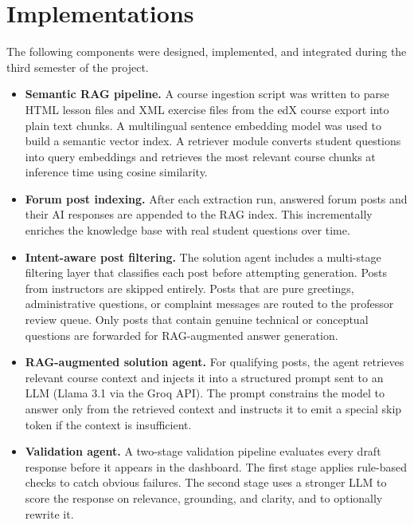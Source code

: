 \documentclass[12pt, a4paper]{article}
\begin{document}
\section{Implementations}

The following components were designed, implemented, and integrated during the third semester of the project.

\begin{itemize}[leftmargin=1.5em, itemsep=4pt]

  \item \textbf{Semantic RAG pipeline.} A course ingestion script was written to parse HTML lesson files and XML exercise files from the edX course export into plain text chunks. A multilingual sentence embedding model \cite{reimers2020multilingual} was used to build a semantic vector index. A retriever module converts student questions into query embeddings and retrieves the most relevant course chunks at inference time using cosine similarity.

  \item \textbf{Forum post indexing.} After each extraction run, answered forum posts and their AI responses are appended to the RAG index. This incrementally enriches the knowledge base with real student questions over time.

  \item \textbf{Intent-aware post filtering.} The solution agent includes a multi-stage filtering layer that classifies each post before attempting generation. Posts from instructors are skipped entirely. Posts that are pure greetings, administrative questions, or complaint messages are routed to the professor review queue. Only posts that contain genuine technical or conceptual questions are forwarded for RAG-augmented answer generation.

  \item \textbf{RAG-augmented solution agent.} For qualifying posts, the agent retrieves relevant course context and injects it into a structured prompt sent to an LLM (Llama 3.1 via the Groq API). The prompt constrains the model to answer only from the retrieved context and instructs it to emit a special skip token if the context is insufficient.

  \item \textbf{Validation agent.} A two-stage validation pipeline evaluates every draft response before it appears in the dashboard. The first stage applies rule-based checks to catch obvious failures. The second stage uses a stronger LLM to score the response on relevance, grounding, and clarity, and to optionally rewrite it.


\end{itemize}
\end{document}
